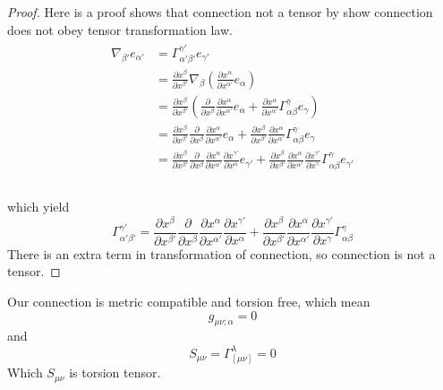 \documentclass[12pt]{article}
\theoremstyle{mystyle}{\newtheorem{definition}{Definition}[section]}
\theoremstyle{mystyle}{\newtheorem{theorem}[definition]{Theorem}}
\theoremstyle{mystyle}{\newtheorem*{remark}{Remark}}
\theoremstyle{mystyle}{\newtheorem*{example}{Example}}
\theoremstyle{mystyle}{\newtheorem*{examples}{Examples}}
\theoremstyle{cstyle}{\newtheorem*{cthm}{}}
\begin{document}
\begin{proof}
  Here is a proof shows that connection not a tensor by show connection does not obey tensor transformation law.
  \begin{align*}
    \begin{split}
      \nabla_{\beta'}e_{\alpha'} & = \Gamma^{\gamma'}_{\alpha'\beta'}e_{\gamma'} \\
      &= \frac{\partial x^{\beta}}{\partial x^{\beta'}}\nabla_{\beta}(\frac{\partial x^{\alpha}}{\partial x^{\alpha'}}e_{\alpha})\\
      &= \frac{\partial x^{\beta}}{\partial x^{\beta'}}
      (\frac{\partial}{\partial x^{\beta}}\frac{\partial x^{\alpha}}{\partial x^{\alpha'}}e_{\alpha}
      + \frac{\partial x^{\alpha}}{\partial x^{\alpha'}} \Gamma ^{\gamma}_{\alpha\beta} e_{\gamma})\\
      &= \frac{\partial x^{\beta}}{\partial x^{\beta'}}
      \frac{\partial}{\partial x^{\beta}}\frac{\partial x^{\alpha}}{\partial x^{\alpha'}}e_{\alpha}
      + \frac{\partial x^{\beta}}{\partial x^{\beta'}}
      \frac{\partial x^{\alpha}}{\partial x^{\alpha'}} \Gamma ^{\gamma}_{\alpha\beta} e_{\gamma}\\
      &= \frac{\partial x^{\beta}}{\partial x^{\beta'}}
      \frac{\partial}{\partial x^{\beta}}\frac{\partial x^{\alpha}}{\partial x^{\alpha'}}\frac{\partial x^{\gamma'}}{\partial x^{\alpha}}e_{\gamma'}
      + \frac{\partial x^{\beta}}{\partial x^{\beta'}}
      \frac{\partial x^{\alpha}}{\partial x^{\alpha'}} \frac{\partial x^{\gamma'}}{\partial x^{\gamma}} \Gamma ^{\gamma}_{\alpha\beta}  e_{\gamma'}\\
    \end{split}
  \end{align*}
  \\
  which yield \[\Gamma^{\gamma'}_{\alpha'\beta'} = \frac{\partial x^{\beta}}{\partial x^{\beta'}}
    \frac{\partial}{\partial x^{\beta}}\frac{\partial x^{\alpha}}{\partial x^{\alpha'}}\frac{\partial x^{\gamma'}}{\partial x^{\alpha}}
    + \frac{\partial x^{\beta}}{\partial x^{\beta'}}
    \frac{\partial x^{\alpha}}{\partial x^{\alpha'}}
    \frac{\partial x^{\gamma'}}{\partial x^{\gamma}} \Gamma ^{\gamma}_{\alpha\beta}\]
  There is an extra term in transformation of connection, so connection is not a tensor.
\end{proof}
Our connection is metric compatible and torsion free, which mean \[g_{\mu\nu;\alpha} = 0\] and\[S_{\mu\nu} = \Gamma_{[\mu\nu]}^{\lambda} = 0 \]
Which \(S_{\mu\nu}\) is torsion tensor.
\end{document}
